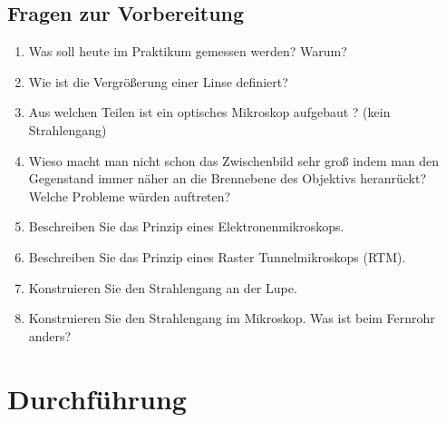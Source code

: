 \begin{tutorhint}
\section{Fragen zur Vorbereitung}

\begin{enumerate}
 \item Was soll heute im Praktikum gemessen werden? Warum?
 \item Wie ist die Vergrößerung einer Linse definiert?
 \item Aus welchen Teilen ist ein optisches Mikroskop aufgebaut ? (kein Strahlengang)
 \item Wieso macht man nicht schon das Zwischenbild sehr groß indem man den Gegenstand immer näher an die Brennebene des Objektivs heranrückt? Welche Probleme würden auftreten?
 \item Beschreiben Sie das Prinzip eines Elektronenmikroskops.
 \item Beschreiben Sie das Prinzip eines Raster Tunnelmikroskops (RTM).
 \item Konstruieren Sie den Strahlengang an der Lupe.
 \item Konstruieren Sie den Strahlengang im Mikroskop. Was ist beim Fernrohr anders?
%
\end{enumerate}
\end{tutorhint}

\section{Durchführung} 




